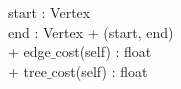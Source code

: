 {
	start : Vertex \\
	end : Vertex
}
{
+ \dunder (start, end) \\
+ edge$\_$cost(self) : float\\
+ tree$\_$cost(self) : float
}